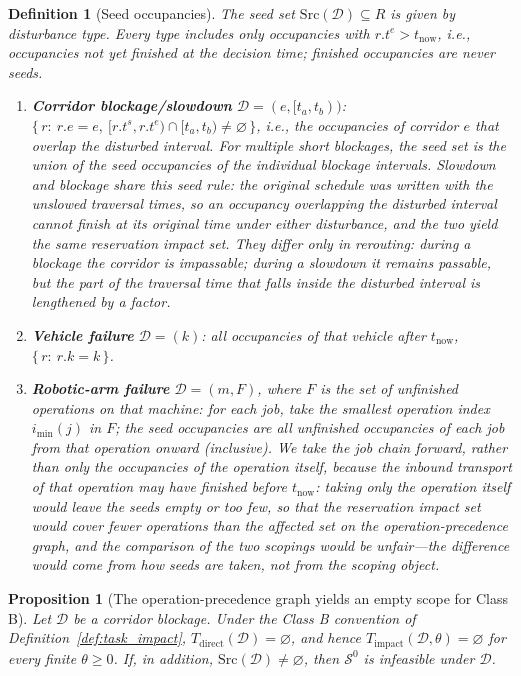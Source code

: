 \documentclass[manuscript,screen,review]{acmart}
\newtheorem{definition}{Definition}
\newtheorem{prop}{Proposition}
\begin{document}
\begin{definition}[Seed occupancies]
\label{def:seeds}
The seed set \(\mathrm{Src}(\mathcal{D})\subseteq R\) is given by disturbance type. Every type includes only occupancies with
\(r.t^e>t_{\mathrm{now}}\), i.e., occupancies not yet finished at the decision time; finished occupancies are never seeds.
\begin{enumerate}[label=(\alph*),leftmargin=1.6em,itemsep=0.15em]
\item \textbf{Corridor blockage/slowdown} \(\mathcal{D}=(e,[t_a,t_b))\):
\(\{\,r:\ r.e=e,\ [r.t^s,r.t^e)\cap[t_a,t_b)\neq\varnothing\,\}\), i.e., the occupancies of corridor \(e\) that overlap the disturbed interval.
For multiple short blockages, the seed set is the union of the seed occupancies of the individual blockage intervals.
Slowdown and blockage share this seed rule: the original schedule was written with the unslowed traversal times, so an occupancy overlapping the disturbed interval
cannot finish at its original time under either disturbance, and the two yield the same reservation impact set. They differ only in rerouting: during a blockage the corridor is impassable;
during a slowdown it remains passable, but the part of the traversal time that falls inside the disturbed interval is lengthened by a factor.
\item \textbf{Vehicle failure} \(\mathcal{D}=(k)\): all occupancies of that vehicle after \(t_{\mathrm{now}}\),
\(\{\,r:\ r.k=k\,\}\).
\item \textbf{Robotic-arm failure} \(\mathcal{D}=(m,F)\), where \(F\) is the set of unfinished operations on that machine:
for each job, take the smallest operation index \(i_{\min}(j)\) in \(F\); the seed occupancies are all unfinished occupancies of each job from that operation onward (inclusive).
We take the job chain forward, rather than only the occupancies of the operation itself, because the inbound transport of that operation may have finished before
\(t_{\mathrm{now}}\): taking only the operation itself would leave the seeds empty or too few, so that the reservation impact set would cover fewer operations than the affected set
on the operation-precedence graph, and the comparison of the two scopings would be unfair---the difference would come from how seeds are taken, not from the scoping object.
\end{enumerate}
\end{definition}

\begin{prop}[The operation-precedence graph yields an empty scope for Class B]
\label{prop:miss}
Let \(\mathcal{D}\) be a corridor blockage. Under the Class B convention of Definition~\ref{def:task_impact},
\(T_{\mathrm{direct}}(\mathcal{D})=\varnothing\), and hence \(T_{\mathrm{impact}}(\mathcal{D},\theta)=\varnothing\) for every finite \(\theta\ge 0\).
If, in addition, \(\mathrm{Src}(\mathcal{D})\neq\varnothing\), then \(\mathcal{S}^0\) is infeasible under \(\mathcal{D}\).
\end{prop}
\end{document}
